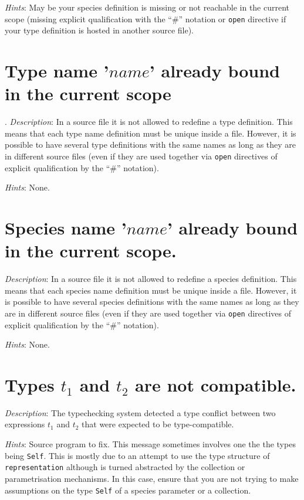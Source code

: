 {\em Hints}: May be your species definition is missing or not
reachable in the current scope (missing explicit qualification with
the ``\#'' notation or {\tt open} directive if your type definition is
hosted in another source file).




\section*{Type name '$name$' already bound in the current scope}.
{\em Description}: In a source file it is not allowed to redefine a
type definition. This means that each type name definition must be
unique inside a file. However, it is possible to have several type
definitions with the same names as long as they are in different
source files (even if they are used together via {\tt open} directives
of explicit qualification by the ``\#'' notation).

{\em Hints}: None.



\section*{Species name '$name$' already bound in the current scope.}
{\em Description}: In a source file it is not allowed to redefine a
species definition. This means that each species name definition must
be unique inside a file. However, it is possible to have several species
definitions with the same names as long as they are in different
source files (even if they are used together via {\tt open} directives
of explicit qualification by the ``\#'' notation).

{\em Hints}: None.



\section*{Types $t_1$ and $t_2$ are not compatible.}
{\em Description}: The typechecking system detected a type conflict
between two expressions $t_1$ and $t_2$ that were expected to be
type-compatible.

{\em Hints}: Source program to fix. This message sometimes involves
one the the types being {\tt Self}. This is mostly due to an attempt
to use the type structure of {\tt representation} although is turned abstracted
by the collection or parametrisation mechanisms. In this case, ensure
that you are not trying to make assumptions on the type {\tt Self} of
a species parameter or a collection.



